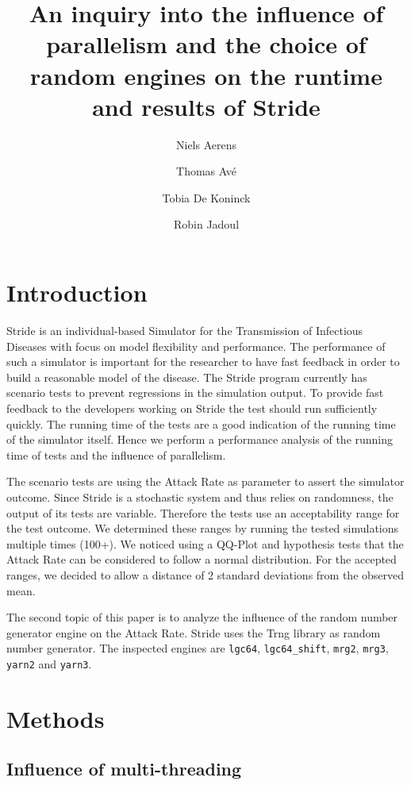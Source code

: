 \documentclass{acmart}
\title{An inquiry into the influence of parallelism and the choice of random
engines on the runtime and results of Stride}
\author{Niels Aerens}
\author{Thomas Avé}
\author{Tobia De Koninck}
\author{Robin Jadoul}
\begin{document}
\maketitle

\section{Introduction}
Stride \cite{KUYLEN20172438} is an individual-based Simulator for the Transmission of Infectious Diseases with focus on model flexibility and
performance. The performance of such a simulator is important for the researcher to have fast feedback in order to
build a reasonable model of the disease. The Stride program currently has scenario tests to prevent regressions in the
simulation output. To provide fast feedback to the developers working on Stride the test should run sufficiently quickly.
The running time of the tests are a good indication of the running time of the simulator itself. Hence we perform a
performance analysis of the running time of tests and the influence of parallelism.

The scenario tests are using the Attack Rate as parameter to assert the simulator outcome. Since Stride is a stochastic
system and thus relies on randomness, the output of its tests are variable. Therefore the tests use an acceptability range
for the test outcome. We determined these ranges by running the tested simulations multiple times (100+). We noticed
using a QQ-Plot and hypothesis tests that the Attack Rate can be considered to follow a normal distribution.
For the accepted ranges, we decided to allow a distance of 2 standard deviations from the observed mean.

The second topic of this paper is to analyze the influence of the random number generator engine on the Attack Rate.
Stride uses the Trng library \cite{bauke2015tina} as random number generator. The inspected engines are \texttt{lgc64}, \texttt{lgc64\_shift}, \texttt{mrg2}, \texttt{mrg3}, \texttt{yarn2} and \texttt{yarn3}.

\pagebreak

\section{Methods}

\subsection{Influence of multi-threading}
\end{document}
